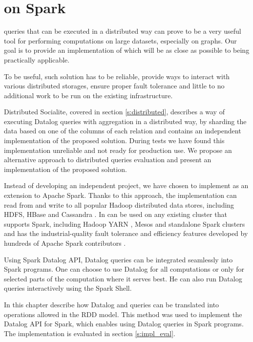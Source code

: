 

\chapter{\datalogra on Spark}\label{r:implementation}

\datalogra queries that can be executed in a distributed way can prove to be a very useful tool for performing computations on large datasets, especially on graphs. Our goal is to provide an implementation of \datalogra which will be as close as possible to being practically applicable.

To be useful, such solution has to be reliable, provide ways to interact with various distributed storages, ensure proper fault tolerance and little to no additional work to be run on the existing infrastructure.

Distributed Socialite, covered in section \ref{s:distributed}, describes a way of executing Datalog queries with aggregation in a distributed way, by sharding the data based on one of the columns of each relation and contains an independent implementation of the proposed solution. During tests we have found this implementation unreliable and not ready for production use. We propose an alternative approach to distributed \datalogra queries evaluation and present an implementation of the proposed solution.

Instead of developing an independent project, we have chosen to implement \datalogra as an extension to Apache Spark. Thanks to this approach, the implementation can read from and write to all popular Hadoop distributed data stores, including HDFS, HBase and Cassandra \cite{sparkwww}. In can be used on any existing cluster that supports Spark, including Hadoop YARN \cite{hadoop}, Mesos and standalone Spark clusters \cite{sparkwww} and has the industrial-quality fault tolerance and efficiency features developed by hundreds of Apache Spark contributors \cite{githubspark}. 

Using Spark Datalog API, Datalog queries can be integrated seamlessly into Spark programs. One can choose to use Datalog for all computations or only for selected parts of the computation where it serves best. He can also run Datalog queries interactively using the Spark Shell.

In this chapter describe how Datalog and \datalogra queries can be translated into operations allowed in the RDD model. This method was used to implement the  Datalog API for Spark, which enables using Datalog queries in Spark programs. The implementation is evaluated in section \ref{s:impl_eval}.


